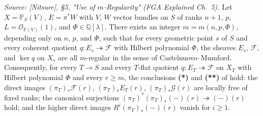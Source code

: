 \begin{lemma}
  \label{lem:quot_boundedness}

  \textit{Source: [Nitsure], \S 5, "Use of \(m\)-Regularity" (FGA Explained
  Ch.~5).}
  Let \(X = \mathbb{P}_S(V)\), \(E = \pi^* W\) with \(V\), \(W\) vector bundles on
  \(S\) of ranks \(n+1\), \(p\), \(L = \mathcal{O}_{\mathbb{P}(V)}(1)\), and
  \(\Phi \in \mathbb{Q}[\lambda]\). There exists an integer
  \(m = m(n, p, \Phi)\), depending only on \(n\), \(p\), and \(\Phi\), such that
  for every geometric point \(s\) of \(S\) and every coherent quotient
  \(q : E_s \twoheadrightarrow \mathcal{F}\) with Hilbert polynomial
  \(\Phi\), the sheaves \(E_s\), \(\mathcal{F}\), and \(\ker q\) on \(X_s\) are all
  \(m\)-regular in the sense of Castelnuovo--Mumford. Consequently, for
  every \(T \to S\) and every \(T\)-flat quotient
  \(q : E_T \twoheadrightarrow \mathcal{F}\) on \(X_T\) with Hilbert
  polynomial \(\Phi\) and every \(r \ge m\), the conclusions \textbf{(*)} and
  \textbf{(**)} of \cite[\S 5, "Use of \(m\)-Regularity"]{nitsure-hilbert-quot}
  hold: the direct images \((\pi_T)_* \mathcal{F}(r)\), \((\pi_T)_* E_T(r)\),
  \((\pi_T)_* \mathcal{G}(r)\) are locally free of fixed ranks; the
  canonical surjections \((\pi_T)^* (\pi_T)_*(-)(r) \twoheadrightarrow (-)(r)\)
  hold; and the higher direct images \(R^i (\pi_T)_* (-)(r)\) vanish for
  \(i \ge 1\).
\end{lemma}

